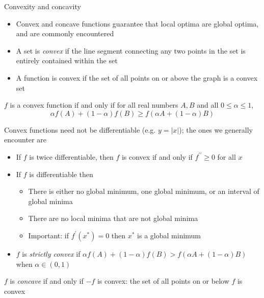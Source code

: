 \documentclass[10pt]{seminar}
\begin{document}
\begin{slide}
\newslide Convexity and concavity

\begin{itemize}
\item Convex and concave functions guarantee that local optima are global optima, and are commonly encountered
\item A set is \textit{convex} if the line segment connecting any two points in the set is entirely contained within the set
\item A function is convex if the set of all points on or above the graph is a convex set

\end{itemize}
\begin{center}
\end{center}

\newslide

$f$ is a convex function if and only if for all real numbers $A, B$ and all $0\leq \alpha \leq 1$, 
$$\alpha f(A)+(1-\alpha)f(B)\geq f(\alpha A+(1-\alpha)B)$$

\begin{center}
\end{center}

\newslide

Convex functions need not be differentiable (e.g. $y=|x|$); the ones we generally encounter are


\begin{itemize}
\item If $f$ is twice differentiable, then $f$ is convex if and only if $f^{\prime\prime}\geq 0$ for all $x$

\item If $f$ is differentiable then
\begin{itemize}
\item There is either no global minimum, one global minimum, or an interval of global minima
\item There are no local minima that are not global minima
\item Important: if $f^\prime(x^*)=0$ then $x^*$ is a global minimum
\end{itemize}
\item $f$ is \textit{strictly convex} if $\alpha f(A)+(1-\alpha)f(B)> f(\alpha A+(1-\alpha)B)$ when $\alpha\in(0, 1)$
\end{itemize}

\newslide

$f$ is \textit{concave} if and only if $-f$ is convex: the set of all points on or below $f$ is convex


\end{slide}
\end{document}
